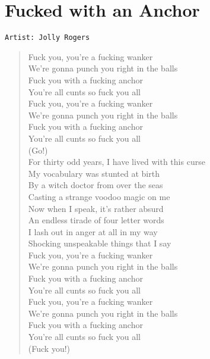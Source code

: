 \documentclass[11pt]{article}
\begin{document}
\section{Fucked with an Anchor}
\label{sec:org8546cef}
\begin{verbatim}
Artist: Jolly Rogers
\end{verbatim}
\begin{verse}
Fuck you, you're a fucking wanker\\
We're gonna punch you right in the balls\\
Fuck you with a fucking anchor\\
You're all cunts so fuck you all\\
Fuck you, you're a fucking wanker\\
We're gonna punch you right in the balls\\
Fuck you with a fucking anchor\\
You're all cunts so fuck you all\\
\vspace*{1em}
(Go!)\\
\vspace*{1em}
For thirty odd years, I have lived with this curse\\
My vocabulary was stunted at birth\\
By a witch doctor from over the seas\\
Casting a strange voodoo magic on me\\
Now when I speak, it's rather absurd\\
An endless tirade of four letter words\\
I lash out in anger at all in my way\\
Shocking unspeakable things that I say\\
\vspace*{1em}
Fuck you, you're a fucking wanker\\
We're gonna punch you right in the balls\\
Fuck you with a fucking anchor\\
You're all cunts so fuck you all\\
Fuck you, you're a fucking wanker\\
We're gonna punch you right in the balls\\
Fuck you with a fucking anchor\\
You're all cunts so fuck you all\\
\vspace*{1em}
(Fuck you!)\\
\vspace*{1em}

\end{verse}
\end{document}
